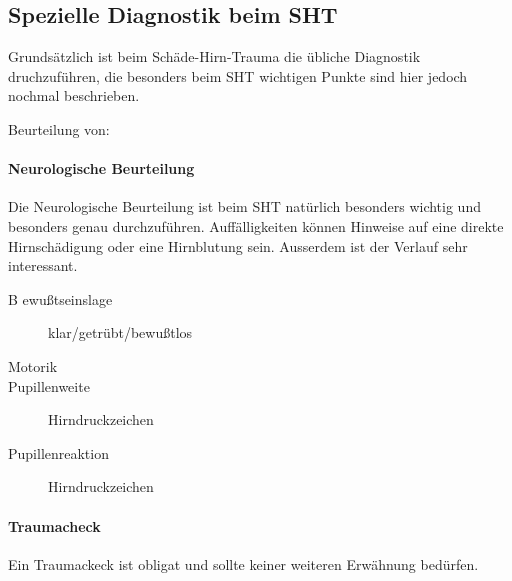\subsection{Spezielle Diagnostik beim SHT}

Grundsätzlich ist beim Schäde-Hirn-Trauma die übliche
Diagnostik druchzuführen, die besonders beim SHT wichtigen
Punkte sind hier jedoch nochmal beschrieben.

Beurteilung von:

\paragraph{Neurologische Beurteilung}

Die Neurologische Beurteilung ist beim SHT natürlich
besonders wichtig und besonders genau durchzuführen.
Auffälligkeiten können Hinweise auf eine direkte
Hirnschädigung oder eine Hirnblutung sein. Ausserdem ist
der Verlauf sehr interessant.

\begin{description}
\item[B ewu{\ss}tseinslage] klar/getr\"ubt/bewu{\ss}tlos
\item[Motorik] 
\item[Pupillenweite] Hirndruckzeichen
\item[Pupillenreaktion] Hirndruckzeichen
\end{description}

\paragraph{Traumacheck} Ein Traumackeck ist obligat
und sollte keiner weiteren Erwähnung bedürfen.




